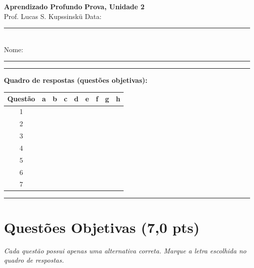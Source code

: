 \documentclass[11pt,a4paper]{article}
\begin{document}
{\Large\bfseries Aprendizado Profundo} \hfill \textbf{Prova, Unidade 2}\\
Prof. Lucas S. Kupssinskü \hfill Data: \rule{3cm}{0.4pt}\\[0.4em]
Nome: \rule{12cm}{0.4pt}

\rule{\linewidth}{0.8pt}

\textbf{Quadro de respostas (questões objetivas):}\\[0.3em]
\begin{center}
\begin{tabular}{|c|c|c|c|c|c|c|c|c|}
\hline
\textbf{Questão} & \textbf{a} & \textbf{b} & \textbf{c} & \textbf{d} & \textbf{e} & \textbf{f} & \textbf{g} & \textbf{h} \\\hline
1 & & & & & & & & \\\hline
2 & & & & & & & & \\\hline
3 & & & & & & & & \\\hline
4 & & & & & & & & \\\hline
5 & & & & & & & & \\\hline
6 & & & & & & & & \\\hline
7 & & & & & & & & \\\hline
\end{tabular}
\end{center}

\rule{\linewidth}{0.4pt}

\section*{Questões Objetivas (7{,}0 pts)}
\textit{Cada questão possui apenas uma alternativa correta. Marque a letra escolhida no quadro de respostas.}
\end{document}
